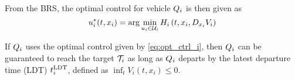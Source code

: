 From the BRS, the optimal control for vehicle $Q_i$ is then given as
\begin{equation}
\label{eq:opt_ctrl_i}
u_i^*(t, x_i) = \arg \min_{u_i \in \mathcal{U}_i} H_i\left(t, x_i, D_{x_i} V_i\right)
\end{equation}

If $Q_i$ uses the optimal control given by \eqref{eq:opt_ctrl_i}, then $Q_i$ can be guaranteed to reach the target $\mathcal{T}_i$ as long as $Q_i$ departs by the latest departure time (LDT) $t^\text{LDT}_i$, defined as $\inf_t V_i(t, x_i) \le 0$.